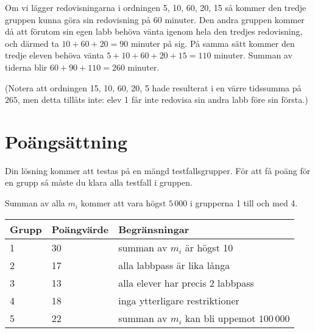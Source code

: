 Om vi lägger redovisningarna i ordningen 5, 10, 60, 20, 15 så kommer den tredje gruppen kunna göra sin redovisning på 60 minuter.
Den andra gruppen kommer då att förutom sin egen labb behöva vänta igenom hela den tredjes redovisning, och därmed ta $10+60+20 = 90$ minuter på sig.
På samma sätt kommer den tredje eleven behöva vänta $5+10+60+20+15 = 110$ minuter.
Summan av tiderna blir $60 + 90 + 110 = 260$ minuter.

(Notera att ordningen 15, 10, 60, 20, 5 hade resulterat i en värre tidssumma på $265$, men detta tillåts inte: elev 1 får inte redovisa sin andra labb före sin första.)

\section*{Poängsättning}
Din lösning kommer att testas på en mängd testfallsgrupper. För att få poäng för en grupp så måste du klara alla testfall i gruppen.

Summan av alla $m_i$ kommer att vara högst $5\,000$ i grupperna 1 till och med 4.

\begin{tabular}{| l | l | l |}
	\hline
	Grupp & Poängvärde & Begränsningar\\ \hline
  1     & 30         & summan av $m_i$ är högst 10 \\ \hline
  2     & 17         & alla labbpass är lika långa \\ \hline
  3     & 13         & alla elever har precis 2 labbpass \\ \hline
  4     & 18         & inga ytterligare restriktioner \\ \hline
  5     & 22         & summan av $m_i$ kan bli uppemot $100\,000$ \\ \hline
\end{tabular}
